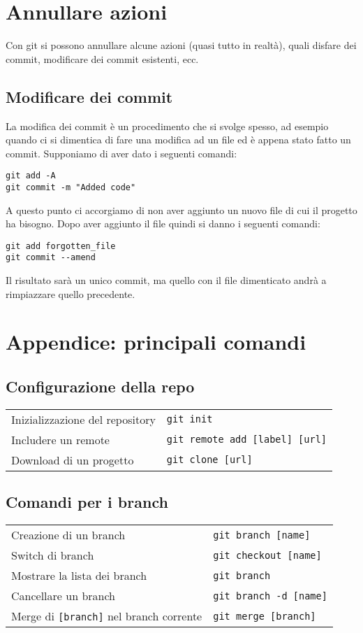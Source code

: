 \documentclass[a4paper, 11pt]{article}
\begin{document}
	\section{Annullare azioni}
	Con git si possono annullare alcune azioni (quasi tutto in realtà), quali disfare dei commit, modificare dei commit esistenti, ecc.
	
	\subsection{Modificare dei commit}
	La modifica dei commit è un procedimento che si svolge spesso, ad esempio quando ci si dimentica di fare una modifica ad un file ed è appena stato fatto un commit. Supponiamo di aver dato i seguenti comandi: \begin{lstlisting}
git add -A
git commit -m "Added code"
	\end{lstlisting}
	
	A questo punto ci accorgiamo di non aver aggiunto un nuovo file di cui il progetto ha bisogno. Dopo aver aggiunto il file quindi si danno i seguenti comandi: \begin{lstlisting}
git add forgotten_file
git commit --amend
	\end{lstlisting}
	
	Il risultato sarà un unico commit, ma quello con il file dimenticato andrà a rimpiazzare quello precedente.
	\newpage
	\renewcommand{\arraystretch}{1.1}
		
		\section{Appendice: principali comandi}
		\subsection{Configurazione della repo}
		\begin{tabular}{p{9cm} p{6cm}}
			Inizializzazione del repository &\verb|git init| \\
			Includere un remote &\verb|git remote add [label] [url]| \\
			Download di un progetto &\verb|git clone [url]| \\
		\end{tabular}
		
		\subsection{Comandi per i branch}
		\begin{tabular}{p{9cm} p{6cm}}
			Creazione di un branch & \verb|git branch [name]| \\
			Switch di branch& \verb|git checkout [name]| \\
			Mostrare la lista dei branch & \verb|git branch| \\
			Cancellare un branch& \verb|git branch -d [name]| \\
			Merge di \verb|[branch]| nel branch corrente& \verb|git merge [branch]|
		\end{tabular}
		
\end{document}
